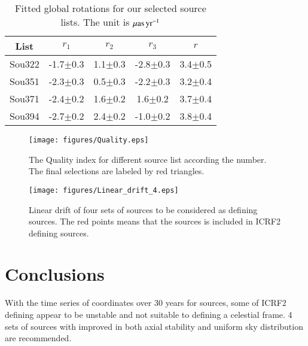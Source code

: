 \documentclass{aa}
\begin{document}
	\begin{table}
	\centering
	\caption{Fitted global rotations for our selected source lists. The unit is  $\mu \rm{as \, yr}^{-1} $}
	\label{Tab:Axi}	
	\begin{tabular}{ccccc}
\hline\hline
List    &$r_1$          &$r_2$          &$r_3$          &$r$    \\
\hline
Sou322 &-1.7$\pm$0.3 &1.1$\pm$0.3 &-2.8$\pm$0.3 &3.4$\pm$0.5 \\
Sou351 &-2.3$\pm$0.3 &0.5$\pm$0.3 &-2.2$\pm$0.3 &3.2$\pm$0.4 \\
Sou371 &-2.4$\pm$0.2 &1.6$\pm$0.2 &1.6$\pm$0.2 &3.7$\pm$0.4 \\
Sou394 &-2.7$\pm$0.2 &2.4$\pm$0.2 &-1.0$\pm$0.2 &3.8$\pm$0.4 \\
\hline
	\end{tabular}
	\end{table}	
	


	\begin{figure}
   \centering
   \texttt{[image: figures/Quality.eps]}
      \caption{
      The Quality index for different source list according the number. The final selections are labeled by red triangles.
              }\label{Fig:com_num}
   \end{figure}

   \begin{figure}
   \centering
	 \texttt{[image: figures/Linear\_drift\_4.eps]}
      \caption{
      Linear drift of four sets of sources to be considered as defining sources. The red points means that the sources is included in ICRF2 defining sources.
              }
         \label{Fig:Ld4}
   \end{figure}
\section{Conclusions}\label{sect:conclusion}
With the time series of coordinates over 30 years for sources, some of ICRF2 defining appear to be unstable and not suitable to defining a celestial frame. 4 sets of sources with improved in both axial stability and uniform sky distribution are recommended.

%



\end{document}

